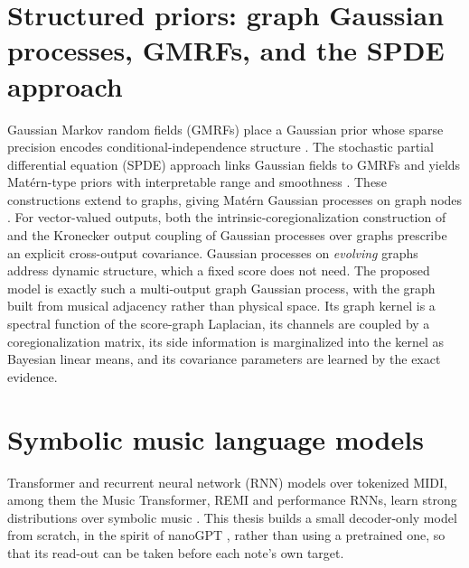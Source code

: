 \documentclass[11pt,a4paper]{report}
\begin{document}
\section{Structured priors: graph Gaussian processes, GMRFs, and the SPDE approach}
Gaussian Markov random fields (GMRFs) place a Gaussian prior whose sparse
precision encodes conditional-independence structure \cite{rueheld2005}. The
stochastic partial differential equation (SPDE) approach links Gaussian fields to GMRFs and yields Mat\'ern-type priors with
interpretable range and smoothness \cite{lindgren2011}. These constructions
extend to graphs, giving Mat\'ern Gaussian processes on graph nodes
\cite{borovitskiy2021}. For vector-valued outputs, both the
intrinsic-coregionalization construction of \cite{borovitskiy2021} and the
Kronecker output coupling of Gaussian processes over graphs
\cite{venkitaraman2018} prescribe an explicit cross-output covariance.
Gaussian processes on \emph{evolving} graphs \cite{blancomulero2021} address
dynamic structure, which a fixed score does not need. The proposed model is
exactly such a multi-output graph Gaussian process, with the graph built
from musical adjacency rather than physical space. Its graph kernel is a
spectral function of the score-graph Laplacian, its channels are coupled by
a coregionalization matrix, its side information is marginalized into the
kernel as Bayesian linear means, and its covariance parameters are learned
by the exact evidence.

\section{Symbolic music language models}
Transformer and recurrent neural network (RNN) models over tokenized MIDI,
among them the Music Transformer, REMI and performance RNNs, learn strong distributions over
symbolic music \cite{musictransformer,remi,oore2018}. This thesis builds a
small decoder-only model from scratch, in the spirit of nanoGPT
\cite{nanogpt}, rather than using a pretrained one, so that its read-out
can be taken before each note's own target.
\end{document}
